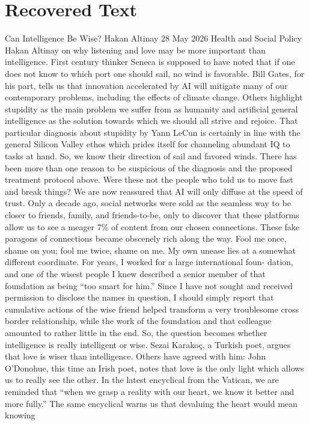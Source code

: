\section{Recovered Text}
Can Intelligence Be Wise?
Hakan Altinay
28 May 2026
Health and Social Policy
Hakan Altinay on why listening and love may be more important than intelligence.
First century thinker Seneca is supposed to have noted that if one does not know to which port one should
sail, no wind is favorable. Bill Gates, for his part, tells us that innovation accelerated by AI will mitigate
many of our contemporary problems, including the effects of climate change. Others highlight stupidity as
the main problem we suffer from as humanity and artificial general intelligence as the solution towards which
we should all strive and rejoice. That particular diagnosis about stupidity by Yann LeCun is certainly in line
with the general Silicon Valley ethos which prides itself for channeling abundant IQ to tasks at hand. So, we
know their direction of sail and favored winds.
There has been more than one reason to be suspicious of the diagnosis and the proposed treatment protocol
above. Were these not the people who told us to move fast and break things? We are now reassured that AI
will only diffuse at the speed of trust. Only a decade ago, social networks were sold as the seamless way to be
closer to friends, family, and friends-to-be, only to discover that these platforms allow us to see a meager 7\%
of content from our chosen connections. These fake paragons of connections became obscenely rich along
the way. Fool me once, shame on you; fool me twice, shame on me.
My own unease lies at a somewhat different coordinate. For years, I worked for a large international foun-
dation, and one of the wisest people I knew described a senior member of that foundation as being “too
smart for him.” Since I have not sought and received permission to disclose the names in question, I should
simply report that cumulative actions of the wise friend helped transform a very troublesome cross border
relationship, while the work of the foundation and that colleague amounted to rather little in the end. So, the
question becomes whether intelligence is really intelligent or wise.
Sezai Karakoç, a Turkish poet, argues that love is wiser than intelligence. Others have agreed with him: John
O’Donohue, this time an Irish poet, notes that love is the only light which allows us to really see the other.
In the latest encyclical from the Vatican, we are reminded that “when we grasp a reality with our heart, we
know it better and more fully.” The same encyclical warns us that devaluing the heart would mean knowing
